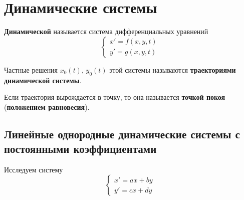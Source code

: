 \section{Динамические системы}
 \textbf{Динамической} называется система дифференциальных уравнений
\begin{equation*}
\begin{cases}
x' = f(x, y, t) \\
y' = g(x, y, t)
\end{cases}
\end{equation*}

Частные решения $x_0(t)$, $y_0(t)$ этой системы называются \textbf{траекториями динамической системы}.

  Если траектория вырождается в точку, то она называется \textbf{точкой покоя} (\textbf{положением равновесия}).

\subsection{Линейные однородные динамические системы с постоянными коэффициентами}
Исследуем систему
\begin{equation*}
\begin{cases}
x' = ax + by \\
y' = cx + dy
\end{cases}
\end{equation*}

